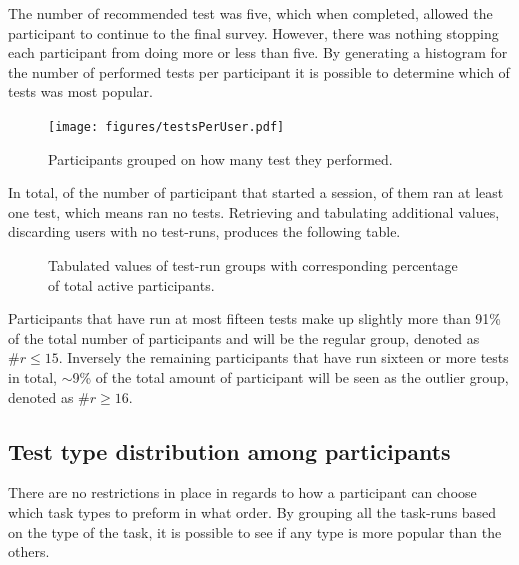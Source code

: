 \documentclass[nofilelist,dvipsnames]{cslthse-msc}
\begin{document}
				The number of recommended test was five, which when completed, allowed
				the participant to continue to the final survey. However, there was
				nothing stopping each participant from doing more or less than five.
        By generating a histogram for the number of performed tests per
        participant it is possible to determine which of tests was most
        popular.

				\begin{figure}[h!]
					\centering
					\texttt{[image: figures/testsPerUser.pdf]}
					\caption{Participants grouped on how many test they performed.}
				\end{figure}

        In total, of the  number of participant that
        started a session,  of them ran at least one
        test, which means  ran no tests. Retrieving and
        tabulating additional values, discarding users with no test-runs,
        produces the following table.

        \begin{figure}[h!]
          \centering
          \caption{
            Tabulated values of test-run groups with corresponding percentage
            of total active participants.
          }
        \end{figure}

        Participants that have run at most fifteen tests make up slightly more
        than 91\% of the total number of participants and will be the regular
        group, denoted as $\#r\leq15$. Inversely the remaining participants
        that have run sixteen or more tests in total, $\sim$9\% of the total
        amount of participant will be seen as the outlier group, denoted as
        $\#r\geq16$.

      \subsection{Test type distribution among participants}

        There are no restrictions in place in regards to how a participant
        can choose which task types to preform in what order. By grouping all
        the task-runs based on the type of the task, it is possible to see if
        any type is more popular than the others.
\end{document}
